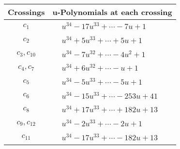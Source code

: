 \documentclass[1p]{elsarticle_modified}
\theoremstyle{definition}
\begin{document}
\begin{tabular}{m{50pt}|m{274pt}}
Crossings & \hspace{64pt}u-Polynomials at each crossing \\
\hline $$\begin{aligned}c_{1}\end{aligned}$$&$\begin{aligned}
&u^{34}-17 u^{33}+\cdots-7 u+1
\end{aligned}$\\
\hline $$\begin{aligned}c_{2}\end{aligned}$$&$\begin{aligned}
&u^{34}+5 u^{33}+\cdots+5 u+1
\end{aligned}$\\
\hline $$\begin{aligned}c_{3},c_{10}\end{aligned}$$&$\begin{aligned}
&u^{34}-7 u^{32}+\cdots-4 u^2+1
\end{aligned}$\\
\hline $$\begin{aligned}c_{4},c_{7}\end{aligned}$$&$\begin{aligned}
&u^{34}+6 u^{32}+\cdots- u+1
\end{aligned}$\\
\hline $$\begin{aligned}c_{5}\end{aligned}$$&$\begin{aligned}
&u^{34}-5 u^{33}+\cdots-5 u+1
\end{aligned}$\\
\hline $$\begin{aligned}c_{6}\end{aligned}$$&$\begin{aligned}
&u^{34}-15 u^{33}+\cdots-253 u+41
\end{aligned}$\\
\hline $$\begin{aligned}c_{8}\end{aligned}$$&$\begin{aligned}
&u^{34}+17 u^{33}+\cdots+182 u+13
\end{aligned}$\\
\hline $$\begin{aligned}c_{9},c_{12}\end{aligned}$$&$\begin{aligned}
&u^{34}-2 u^{33}+\cdots-2 u+1
\end{aligned}$\\
\hline $$\begin{aligned}c_{11}\end{aligned}$$&$\begin{aligned}
&u^{34}-17 u^{33}+\cdots-182 u+13
\end{aligned}$\\
\hline
\end{tabular}\\~\\
\end{document}
